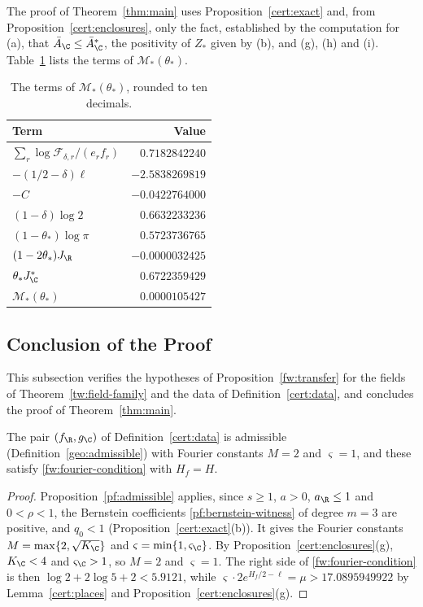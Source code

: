 The proof of Theorem~\ref{thm:main} uses Proposition~\ref{cert:exact} and,
from Proposition~\ref{cert:enclosures}, only the fact, established by the
computation for (a), that $\bar A_\C\le\bar A_\C^*$, the positivity of $Z_*$
given by (b), and (g), (h) and (i). Table~\ref{cert:tab-budget} lists the
terms of $\mathcal M_*(\theta_*)$.

\begin{table}[htbp]
\centering\small
\caption{The terms of $\mathcal M_*(\theta_*)$, rounded to ten decimals.}
\label{cert:tab-budget}
\begin{tabular}{lr}
\toprule
Term & Value\\
\midrule
$\sum_r\log\mathcal F_{\delta,r}/(e_rf_r)$ & $0.7182842240$\\
$-(1/2-\delta)\ell$ & $-2.5838269819$\\
$-C$ & $-0.0422764000$\\
$(1-\delta)\log2$ & $0.6632233236$\\
$(1-\theta_*)\log\pi$ & $0.5723736765$\\
$(1-2\theta_*)J_\R$ & $-0.0000032425$\\
$\theta_*J_\C^*$ & $0.6722359429$\\
\midrule
$\mathcal M_*(\theta_*)$ & $0.0000105427$\\
\bottomrule
\end{tabular}
\end{table}

\subsection{Conclusion of the Proof}

This subsection verifies the hypotheses of Proposition~\ref{fw:transfer} for
the fields of Theorem~\ref{tw:field-family} and the data of
Definition~\ref{cert:data}, and concludes the proof of
Theorem~\ref{thm:main}.

\begin{corollary}\label{cert:fourier}
The pair $(f_\R,g_\C)$ of Definition~\ref{cert:data} is admissible
(Definition~\ref{geo:admissible}) with
Fourier constants $M=2$ and $\varsigma=1$, and these satisfy
\eqref{fw:fourier-condition} with $H_f=H$.
\end{corollary}

\begin{proof}
Proposition~\ref{pf:admissible} applies, since $s\ge1$, $a>0$,
$a_\R\le1$ and $0<\rho<1$, the Bernstein coefficients
\eqref{pf:bernstein-witness} of degree $m=3$ are positive, and $q_0<1$
(Proposition~\ref{cert:exact}(b)). It gives the Fourier constants
$M=\max\{2,\sqrt{K_\C}\}$ and $\varsigma=\min\{1,\varsigma_\C\}$. By
Proposition~\ref{cert:enclosures}(g), $K_\C<4$ and $\varsigma_\C>1$, so
$M=2$ and $\varsigma=1$. The right side of \eqref{fw:fourier-condition} is
then $\log2+2\log5+2<5.9121$, while
$\varsigma\cdot2e^{H_f/2-\ell}=\mu>17.0895949922$ by Lemma~\ref{cert:places}
and Proposition~\ref{cert:enclosures}(g).
\end{proof}


